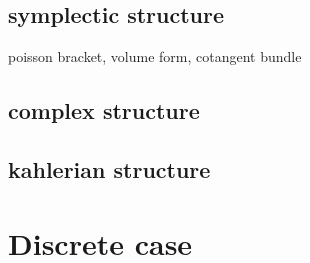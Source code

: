 \subsection{symplectic structure}

poisson bracket, volume form, cotangent bundle

\subsection{complex structure}

\subsection{kahlerian structure}


\clearpage
\section{Discrete case}



